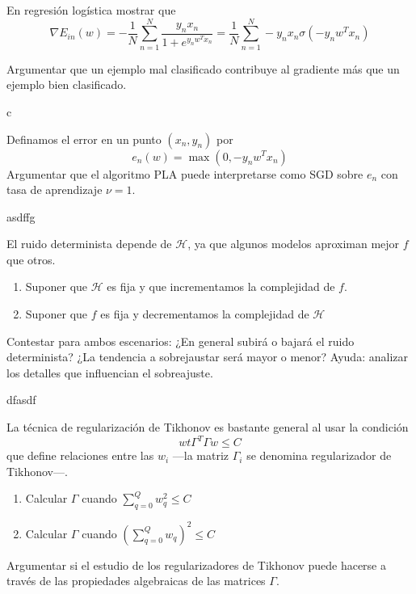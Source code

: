 \documentclass[a4paper, 11pt]{article}
\begin{document}
      \begin{ejercicio}
        En regresión logística mostrar que
        \[
        \nabla E_{in}(w)=-\frac{1}{N}\sum_{n=1}^{N}\frac{y_nx_n}{1+e^{y_nw^Tx_n}}= \frac{1}{N}\sum_{n=1}^{N}-y_nx_n\sigma(-y_nw^Tx_n)
        \]

        Argumentar que un ejemplo mal clasificado contribuye al gradiente más que un ejemplo bien clasificado.
      \end{ejercicio}

      \begin{solucion}
        c
      \end{solucion}

      \begin{ejercicio}
        Definamos el error en un punto $(x_n,y_n)$ por
          \[
          e_n(w)=\max(0,-y_nw^Tx_n)
          \]
          Argumentar que el algoritmo PLA puede interpretarse como SGD sobre $e_n$ con tasa de aprendizaje $\nu=1$.
      \end{ejercicio}

      \begin{solucion}
        asdffg
      \end{solucion}

      \begin{ejercicio}
        El ruido determinista depende de $\mathcal{H}$, ya que algunos modelos aproximan mejor $f$ que otros.
        \begin{enumerate}
            \item Suponer que $\mathcal{H}$ es fija y que incrementamos la complejidad de $f$.
            \item Suponer que $f$ es fija y decrementamos la complejidad de $\mathcal{H}$
        \end{enumerate}
        Contestar para ambos escenarios: ¿En general subirá o bajará el ruido determinista? ¿La tendencia a sobrejaustar será mayor o menor? Ayuda: analizar los detalles que influencian el sobreajuste.
      \end{ejercicio}

      \begin{solucion}
        dfasdf
      \end{solucion}


      \begin{ejercicio}
        La técnica de regularización de Tikhonov es bastante general al usar la condición
        \[
        wt\Gamma^T\Gamma w \leq C
        \]
        que define relaciones entre las $w_i$ ---la matriz $\Gamma_i$ se denomina regularizador de Tikhonov---.
        \begin{enumerate}
        \item Calcular $\Gamma$ cuando $\sum_{q=0}^Q w_q^2 \leq C$
        \item Calcular $\Gamma$ cuando $(\sum_{q=0}^Q w_q)^2 \leq C$
        \end{enumerate}
        Argumentar si el estudio de los regularizadores de Tikhonov puede hacerse a través de las propiedades algebraicas de las matrices $\Gamma$.
      \end{ejercicio}
\end{document}
